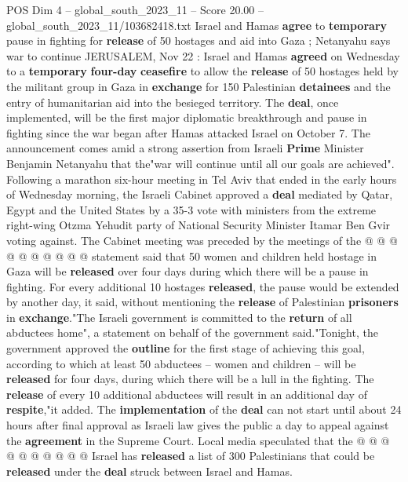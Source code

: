 \begin{textsample}{POS Dim 4 – global\_south\_2023\_11 – Score 20.00 – global\_south\_2023\_11/103682418.txt}  \label{ex:f4_pos_154}
Israel and Hamas \textbf{agree} to \textbf{temporary} pause in fighting for \textbf{release} of 50 hostages and aid into Gaza ; Netanyahu says war to continue JERUSALEM, Nov 22 : Israel and Hamas \textbf{agreed} on Wednesday to a \textbf{temporary} \textbf{four-day} \textbf{ceasefire} to allow the \textbf{release} of 50 hostages held by the militant group in Gaza in \textbf{exchange} for 150 Palestinian \textbf{detainees} and the entry of humanitarian aid into the besieged territory.
The \textbf{deal}, once implemented, will be the first major diplomatic breakthrough and pause in fighting since the war began after Hamas attacked Israel on October 7.
The announcement comes amid a strong assertion from Israeli \textbf{Prime} Minister Benjamin Netanyahu that the"war will continue until all our goals are achieved".
Following a marathon six-hour meeting in Tel Aviv that ended in the early hours of Wednesday morning, the Israeli Cabinet approved a \textbf{deal} mediated by Qatar, Egypt and the United States by a 35-3 vote with ministers from the extreme right-wing Otzma Yehudit party of National Security Minister Itamar Ben Gvir voting against.
The Cabinet meeting was preceded by the meetings of the @ @ @ @ @ @ @ @ @ @ statement said that 50 women and children held hostage in Gaza will be \textbf{released} over four days during which there will be a pause in fighting.
For every additional 10 hostages \textbf{released}, the pause would be extended by another day, it said, without mentioning the \textbf{release} of Palestinian \textbf{prisoners} in \textbf{exchange}."The Israeli government is committed to the \textbf{return} of all abductees home", a statement on behalf of the government said."Tonight, the government approved the \textbf{outline} for the first stage of achieving this goal, according to which at least 50 abductees -- women and children -- will be \textbf{released} for four days, during which there will be a lull in the fighting.
The \textbf{release} of every 10 additional abductees will result in an additional day of \textbf{respite},"it added.
The \textbf{implementation} of the \textbf{deal} can not start until about 24 hours after final approval as Israeli law gives the public a day to appeal against the \textbf{agreement} in the Supreme Court.
Local media speculated that the @ @ @ @ @ @ @ @ @ @ Israel has \textbf{released} a list of 300 Palestinians that could be \textbf{released} under the \textbf{deal} struck between Israel and Hamas.

\end{textsample}
